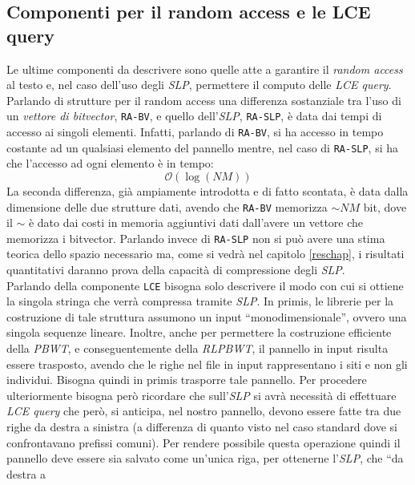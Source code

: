 \subsection{Componenti per il random access e le LCE query}
Le ultime componenti da descrivere sono quelle atte a garantire il
\textit{random access} 
al testo e, nel caso dell'uso degli \textit{SLP}, permettere il computo delle
\textit{LCE query}.\\
Parlando di strutture per il random access una differenza sostanziale tra
l'uso di un \textit{vettore di bitvector}, \texttt{RA-BV}, e quello
dell'\textit{SLP}, \texttt{RA-SLP}, è data dai tempi di accesso ai singoli
elementi. Infatti, parlando di \texttt{RA-BV}, si ha accesso in tempo costante
ad un qualsiasi elemento del pannello mentre, nel caso di \texttt{RA-SLP}, si ha
che l'accesso ad ogni elemento è in tempo:
\begin{equation}
  \label{eq:timera}
  \mathcal{O}(\log (NM))
\end{equation}
La seconda differenza, già ampiamente introdotta e di fatto scontata, è data
dalla dimensione delle due strutture dati, avendo che \texttt{RA-BV} memorizza
$\sim NM$ bit, dove il $\sim$ è dato dai costi in memoria aggiuntivi dati
dall'avere un vettore che memorizza i bitvector. Parlando invece di
\texttt{RA-SLP} non si può avere una stima teorica dello spazio necessario ma,
come si vedrà nel capitolo \ref{reschap}, i risultati quantitativi daranno prova
della capacità di compressione degli \textit{SLP}.\\
Parlando della componente \texttt{LCE} bisogna solo descrivere il modo con cui
si ottiene la singola stringa che verrà compressa tramite \textit{SLP}.
In primis, le
librerie per la costruzione di tale struttura assumono un input
``monodimensionale'', ovvero una singola sequenze lineare. Inoltre, anche per
permettere la costruzione efficiente della \textit{PBWT}, e conseguentemente
della \textit{RLPBWT}, il pannello in input risulta essere trasposto, avendo che
le righe nel file in input rappresentano i siti e non gli individui. Bisogna
quindi in primis trasporre tale pannello. Per procedere ulteriormente bisogna
però ricordare che sull'\textit{SLP} si avrà 
necessità di effettuare \textit{LCE query} che però, si anticipa, nel nostro
pannello, devono essere fatte tra due righe da destra a sinistra (a differenza
di quanto visto nel caso standard dove si confrontavano prefissi comuni). Per
rendere possibile questa operazione quindi il pannello deve essere sia 
salvato come un'unica riga, per ottenerne l'\textit{SLP}, che ``da destra a
